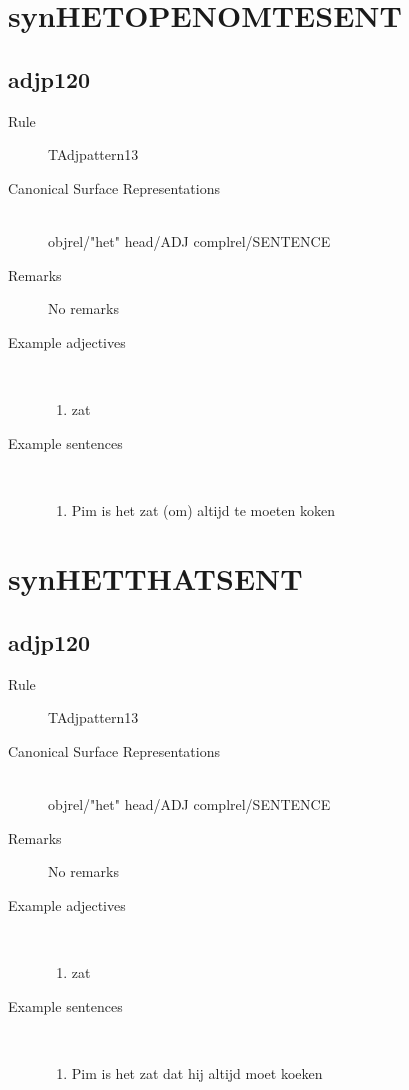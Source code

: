 \section{synHETOPENOMTESENT}
\subsection{adjp120}
\begin{description}
  \item [Rule] TAdjpattern13
  \item [Canonical Surface Representations]  \mbox{}\\ 
objrel/"het" head/ADJ complrel/SENTENCE
  \item [Remarks] No remarks
  \item [Example adjectives] \mbox{}\\
\begin{enumerate}
  \item zat
\end{enumerate}
  \item [Example sentences] \mbox{}\\
\begin{enumerate}
  \item Pim is het zat (om) altijd te moeten koken
\end{enumerate}
\end{description}
\newpage
\section{synHETTHATSENT}
\subsection{adjp120}
\begin{description}
  \item [Rule] TAdjpattern13
  \item [Canonical Surface Representations]  \mbox{}\\ 
objrel/"het" head/ADJ complrel/SENTENCE
  \item [Remarks] No remarks
  \item [Example adjectives] \mbox{}\\
\begin{enumerate}
  \item zat
\end{enumerate}
  \item [Example sentences] \mbox{}\\
\begin{enumerate}
  \item Pim is het zat dat hij altijd moet koeken
\end{enumerate}
\end{description}
\newpage
